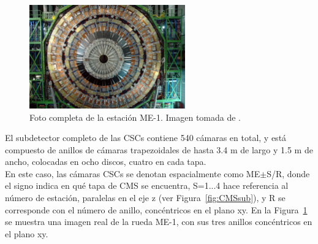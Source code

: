 \begin{figure}[h]
\centering
\includegraphics[width=0.60\textwidth]{figures/CSC_MEm1.jpg}
\caption{Foto completa de la estaci\'on ME-1. Imagen tomada de \cite{Breedon:1431505}.}
\label{fig:CSC_MEm1}        
\end{figure}


El subdetector completo de las CSCs contiene 540 c\'amaras en total, y est\'a compuesto de anillos de c\'amaras trapezoidales de hasta 3.4 m de largo y 1.5 m de ancho, colocadas en ocho discos, cuatro en cada tapa. \\
En este caso, las c\'amaras CSCs se denotan espacialmente como ME$\pm$S/R, donde el signo indica en qu\'e tapa de CMS se encuentra, S=1...4 hace referencia al n\'umero de estaci\'on, paralelas en el eje z (ver Figura~\ref{fig:CMSsub}), y R se corresponde con el n\'umero de anillo, conc\'entricos en el plano xy. En la Figura~\ref{fig:CSC_MEm1} se muestra una imagen real de la rueda ME-1, con sus tres anillos conc\'entricos en el plano xy. \\ \\ 

